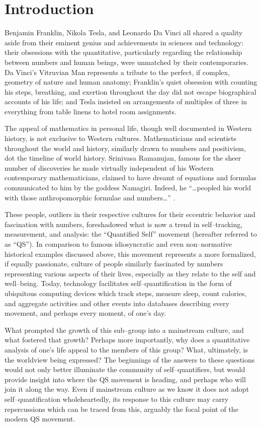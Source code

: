 \documentclass{article}
\begin{document}
\section*{Introduction}
Benjamin Franklin,
Nikola Tesla,
and Leonardo Da Vinci all shared a quality aside from their eminent genius and achievements in sciences and technology:
their obsessions with the quantitative,
particularly regarding the relationship between numbers and human beings,
were unmatched by their contemporaries.
Da Vinci's Vitruvian Man represents a tribute to the perfect,
if complex,
geometry of nature and human anatomy;
Franklin's quiet obsession with counting his steps,
breathing,
and exertion throughout the day did not escape biographical accounts of his life;
and Tesla insisted on arrangements of multiples of three in everything from table linens to hotel room assignments.

The appeal of mathematics in personal life,
though well documented in Western history,
is not exclusive to Western cultures.
Mathematicians and scientists throughout the world and history,
similarly drawn to numbers and positivism,
dot the timeline of world history.
Srinivasa Ramanujan,
famous for the sheer number of discoveries he made virtually independent of his Western contemporary mathematicians,
claimed to have dreamt of equations and formulas communicated to him by the goddess Namagiri.
Indeed,
he ``\dots peopled his world with those anthropomorphic formulae and numbers\dots''
\citep{nandy1998return}.

These people,
outliers in their respective cultures for their eccentric behavior and fascination with numbers,
foreshadowed what is now a trend in self--tracking,
measurement,
and analysis:
the ``Quantified Self'' movement
(hereafter referred to as ``QS''). %
In comparison to famous idiosyncratic and even non--normative historical examples discussed above,
this movement represents a more formalized,
if equally passionate,
culture of people similarly fascinated by numbers representing various aspects of their lives,
especially as they relate to the self and well--being.
Today,
technology facilitates self--quantification in the form of ubiquitous computing devices which track steps,
measure sleep,
count calories,
and aggregate activities and other events into databases describing every movement,
and perhaps every moment,
of one's day.

What prompted the growth of this sub--group into a mainstream culture,
and what fostered that growth? Perhaps more importantly,
why does a quantitative analysis of one's life appeal to the members of this group? What,
ultimately,
is the worldview being expressed? The beginnings of the answers to these questions would not only better illuminate the community of self--quantifiers,
but would provide insight into where the QS movement is heading,
and perhaps who will join it along the way.
Even if mainstream culture as we know it does not adopt self--quantification wholeheartedly,
its response to this culture may carry repercussions which can be traced from this,
arguably the focal point of the modern QS movement.
\end{document}
